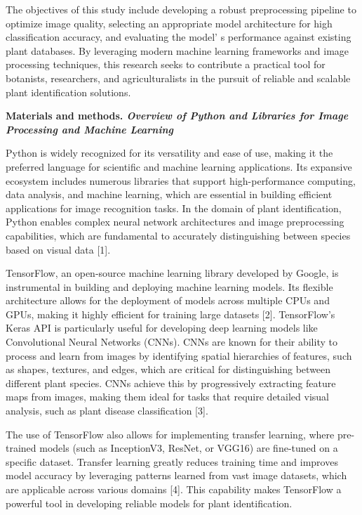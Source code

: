 {{The objectives of this study include developing a robust preprocessing
pipeline to optimize image quality, selecting an appropriate model
architecture for high classification accuracy, and evaluating the
model' s performance against existing plant databases. By
leveraging modern machine learning frameworks and image processing
techniques, this research seeks to contribute a practical tool for
botanists, researchers, and agriculturalists in the pursuit of reliable
and scalable plant identification solutions.

{\bfseries Materials and methods. \emph{Overview of Python and Libraries
for Image Processing and Machine Learning}}

Python is widely recognized for its versatility and ease of use, making
it the preferred language for scientific and machine learning
applications. Its expansive ecosystem includes numerous libraries that
support high-performance computing, data analysis, and machine learning,
which are essential in building efficient applications for image
recognition tasks. In the domain of plant identification, Python enables
complex neural network architectures and image preprocessing
capabilities, which are fundamental to accurately distinguishing between
species based on visual data {[}1{]}.

TensorFlow, an open-source machine learning library developed by Google,
is instrumental in building and deploying machine learning models. Its
flexible architecture allows for the deployment of models across
multiple CPUs and GPUs, making it highly efficient for training large
datasets {[}2{]}. TensorFlow's Keras API is particularly useful for
developing deep learning models like Convolutional Neural Networks
(CNNs). CNNs are known for their ability to process and learn from
images by identifying spatial hierarchies of features, such as shapes,
textures, and edges, which are critical for distinguishing between
different plant species. CNNs achieve this by progressively extracting
feature maps from images, making them ideal for tasks that require
detailed visual analysis, such as plant disease classification {[}3{]}.

The use of TensorFlow also allows for implementing transfer learning,
where pre-trained models (such as InceptionV3, ResNet, or VGG16) are
fine-tuned on a specific dataset. Transfer learning greatly reduces
training time and improves model accuracy by leveraging patterns learned
from vast image datasets, which are applicable across various domains
{[}4{]}. This capability makes TensorFlow a powerful tool in developing
reliable models for plant identification.

}}
